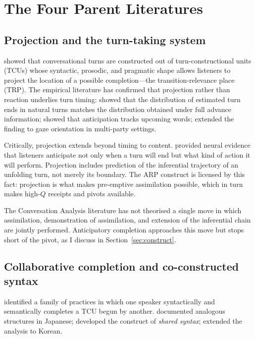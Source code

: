 \section{The Four Parent Literatures}\label{sec:background}

\subsection{Projection and the turn-taking system}

\citet{Sacks1974} showed that conversational turns are constructed out of turn-constructional units (TCUs) whose syntactic, prosodic, and pragmatic shape allows listeners to project the location of a possible completion---the transition-relevance place (TRP). The empirical literature has confirmed that projection rather than reaction underlies turn timing: \citet{Riest2015} showed that the distribution of estimated turn ends in natural turns matches the distribution obtained under full advance information; \citet{MagyariDeRuiter2012} showed that anticipation tracks upcoming words; \citet{HollerKendrick2015} extended the finding to gaze orientation in multi-party settings.

Critically, projection extends beyond timing to content. \citet{Gisladottir2015} provided neural evidence that listeners anticipate not only when a turn will end but what kind of action it will perform. Projection includes prediction of the inferential trajectory of an unfolding turn, not merely its boundary. The ARP construct is licensed by this fact: projection is what makes pre-emptive assimilation possible, which in turn makes high-$Q$ receipts and pivots available.

The Conversation Analysis literature has not theorised a single move in which assimilation, demonstration of assimilation, and extension of the inferential chain are jointly performed. Anticipatory completion \citep{Lerner1991,Lerner1996,Hayashi2003} approaches this move but stops short of the pivot, as I discuss in Section~\ref{sec:construct}.

\subsection{Collaborative completion and co-constructed syntax}

\citet{Lerner1991} identified a family of practices in which one speaker syntactically and semantically completes a TCU begun by another. \citet{Hayashi2003} documented analogous structures in Japanese; \citet{Helasvuo2004} developed the construct of \emph{shared syntax}; \citet{Kim2003} extended the analysis to Korean.

